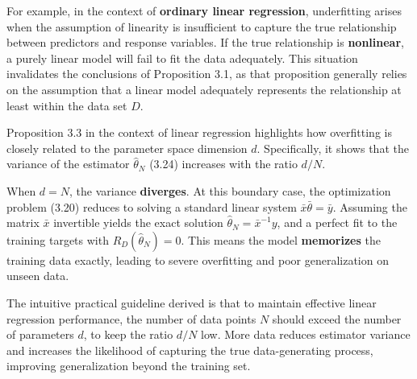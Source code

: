 \documentclass{report}
\begin{document}
For example, in the context of \textbf{ordinary linear regression}, underfitting arises when the assumption of linearity is insufficient to capture the true relationship between predictors and response variables. If the true relationship is \textbf{nonlinear}, a purely linear model will fail to fit the data adequately. This situation invalidates the conclusions of Proposition 3.1, as that proposition generally relies on the assumption that a linear model adequately represents the relationship at least within the data set $D$.

Proposition 3.3 in the context of linear regression highlights how overfitting is closely related to the parameter space dimension $d$. Specifically, it shows that the variance of the estimator $\hat{\theta}_N$ (3.24) increases with the ratio $d/N$.

When $d = N$, the variance \textbf{diverges}. At this boundary case, the optimization problem (3.20) reduces to solving a standard linear system $\bar{x}\bar{\theta} = \bar{y}$. Assuming the matrix $\bar{x}$ invertible yields the exact solution $\hat{\theta}_N = \bar{x}^{-1}y$, and a perfect fit to the training targets with $R_D(\hat{\theta}_N) = 0$. This means the model \textbf{memorizes} the training data exactly, leading to severe overfitting and poor generalization on unseen data.

The intuitive practical guideline derived is that to maintain effective linear regression performance, the number of data points $N$ should exceed the number of parameters $d$, to keep the ratio $d/N$ low. More data reduces estimator variance and increases the likelihood of capturing the true data-generating process, improving generalization beyond the training set.


\end{document}
